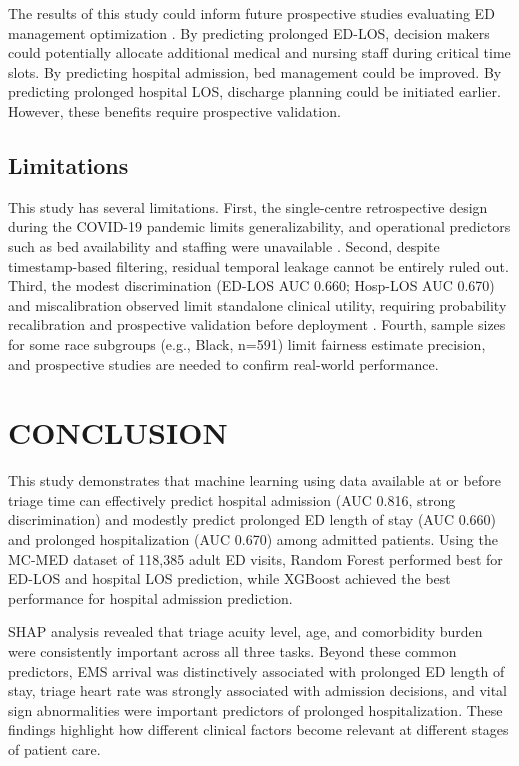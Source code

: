 \documentclass[harvard,article]{frontiersinFPHY_FAMS}
\begin{document}
The results of this study could inform future prospective studies evaluating ED management optimization \cite{schuetz2013, vanderhaas2026}. By predicting prolonged ED-LOS, decision makers could potentially allocate additional medical and nursing staff during critical time slots. By predicting hospital admission, bed management could be improved. By predicting prolonged hospital LOS, discharge planning could be initiated earlier. However, these benefits require prospective validation.

\subsection{Limitations}

This study has several limitations. First, the single-centre retrospective design during the COVID-19 pandemic limits generalizability, and operational predictors such as bed availability and staffing were unavailable \cite{wong2025, cardosi2021, morley2018, pines2011}. Second, despite timestamp-based filtering, residual temporal leakage cannot be entirely ruled out. Third, the modest discrimination (ED-LOS AUC 0.660; Hosp-LOS AUC 0.670) and miscalibration observed limit standalone clinical utility, requiring probability recalibration and prospective validation before deployment \cite{hosseini2026, raff2024}. Fourth, sample sizes for some race subgroups (e.g., Black, n=591) limit fairness estimate precision, and prospective studies are needed to confirm real-world performance.
\section{CONCLUSION}

This study demonstrates that machine learning using data available at or before triage time can effectively predict hospital admission (AUC 0.816, strong discrimination) and modestly predict prolonged ED length of stay (AUC 0.660) and prolonged hospitalization (AUC 0.670) among admitted patients. Using the MC-MED dataset of 118,385 adult ED visits, Random Forest performed best for ED-LOS and hospital LOS prediction, while XGBoost achieved the best performance for hospital admission prediction.

SHAP analysis revealed that triage acuity level, age, and comorbidity burden were consistently important across all three tasks. Beyond these common predictors, EMS arrival was distinctively associated with prolonged ED length of stay, triage heart rate was strongly associated with admission decisions, and vital sign abnormalities were important predictors of prolonged hospitalization. These findings highlight how different clinical factors become relevant at different stages of patient care.
\end{document}
